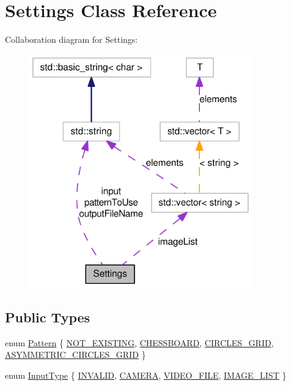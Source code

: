 \hypertarget{classSettings}{
\section{Settings Class Reference}
\label{classSettings}
}


Collaboration diagram for Settings:\nopagebreak
\begin{figure}[H]
\begin{center}
\leavevmode
\includegraphics[width=272pt]{classSettings__coll__graph}
\end{center}
\end{figure}
\subsection*{Public Types}
\begin{DoxyCompactItemize}
\item 
enum \hyperlink{classSettings_a0e7117abd9427a6f8bc1d1d8d456b5c8}{Pattern} \{ \hyperlink{classSettings_a0e7117abd9427a6f8bc1d1d8d456b5c8ad2f421ce100bd7e0302b17bda1a74eb9}{NOT\_\-EXISTING}, 
\hyperlink{classSettings_a0e7117abd9427a6f8bc1d1d8d456b5c8ae96aa2d60b4a554a215524a05b32908e}{CHESSBOARD}, 
\hyperlink{classSettings_a0e7117abd9427a6f8bc1d1d8d456b5c8a79472d1c69f8ed7aa1b55f908b136f68}{CIRCLES\_\-GRID}, 
\hyperlink{classSettings_a0e7117abd9427a6f8bc1d1d8d456b5c8a2cea29ee5896f2cb4cc64df25fd2375b}{ASYMMETRIC\_\-CIRCLES\_\-GRID}
 \}
\item 
enum \hyperlink{classSettings_a5afe85d24b071973a7f248c05386f7f4}{InputType} \{ \hyperlink{classSettings_a5afe85d24b071973a7f248c05386f7f4adb44130895aedc32a119565eb6d61bed}{INVALID}, 
\hyperlink{classSettings_a5afe85d24b071973a7f248c05386f7f4aba4cc7726878c8913831f0ea6360fa05}{CAMERA}, 
\hyperlink{classSettings_a5afe85d24b071973a7f248c05386f7f4ac9fd97535bc651249f9eed1fddf2d36b}{VIDEO\_\-FILE}, 
\hyperlink{classSettings_a5afe85d24b071973a7f248c05386f7f4a292bd2e5ba912a92ace1606e366edc4d}{IMAGE\_\-LIST}
 \}
\end{DoxyCompactItemize}
